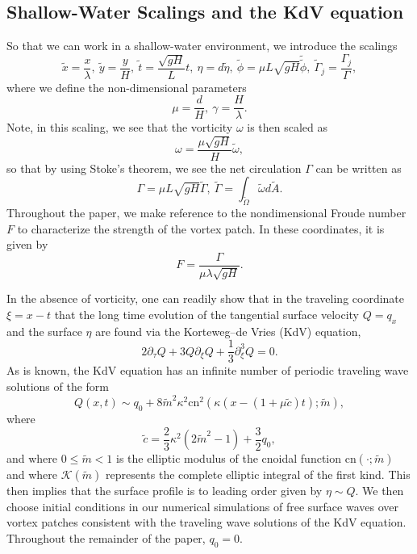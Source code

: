 \documentclass[a4paper,11pt]{article}
\newcommand{\p}{\partial}
\begin{document}
\subsection*{Shallow-Water Scalings and the KdV equation}
So that we can work in a shallow-water environment, we introduce the scalings 
\[
\tilde{x} = \frac{x}{\lambda}, ~\tilde{y} = \frac{y}{H}, ~ \tilde{t} = \frac{\sqrt{gH}}{L} t, ~ \eta = d\tilde{\eta}, ~ \tilde{\phi} = \mu L\sqrt{gH} \tilde{\tilde{\phi}}, ~ \tilde{\Gamma}_{j} = \frac{\Gamma_{j}}{\Gamma},
\]
where we define the non-dimensional parameters
\[
\mu= \frac{d}{H}, ~ \gamma = \frac{H}{\lambda}.  
\]
Note, in this scaling, we see that the vorticity $\omega$ is then scaled as 
\[
\omega = \frac{\mu \sqrt{gH}}{H}\tilde{\omega},
\]
so that by using Stoke's theorem, we see the net circulation $\Gamma$ can be written as 
\[
\Gamma = \mu L \sqrt{gH} \tilde{\Gamma}, ~ \tilde{\Gamma} = \int_{ \tilde{\Omega} } \tilde{\omega} d\tilde{A}.
\]
Throughout the paper, we make reference to the nondimensional Froude number $F$ to characterize the strength of the vortex patch.  In these coordinates, it is given by 
\[
F = \frac{\Gamma}{\mu \lambda \sqrt{gH}}.
\]

In the absence of vorticity, one can readily show that in the traveling coordinate $\xi = x-t$ that the long time evolution of the tangential surface velocity $Q = q_{x}$ and the surface $\eta$ are found via the Korteweg--de Vries (KdV) equation, 
\[
2\p_{\tau}Q + 3Q\p_{\xi}Q + \frac{1}{3} \p_{\xi}^{3}Q = 0.
\]
As is known, the KdV equation has an infinite number of periodic traveling wave solutions of the form 
\begin{equation}
Q(x,t) \sim q_{0} + 8 \tilde{m}^{2}\kappa^{2}\mbox{cn}^{2}\left(\kappa \left( x- \left(1 + \mu \tilde{c}\right)t\right);\tilde{m}\right),
\label{kdvsolpot}
\end{equation}
where
\[
\tilde{c} = \frac{2}{3}\kappa^{2} (2\tilde{m}^{2}-1)+\frac{3}{2}q_{0},
\]
and where $0\leq \tilde{m}<1$ is the elliptic modulus of the cnoidal function $\mbox{cn}(\cdot;\tilde{m})$ and where $\mathcal{K}(\tilde{m})$ represents the complete elliptic integral of the first kind.  This then implies that the surface profile is to leading order given by $\eta \sim Q$.  We then choose initial conditions in our numerical simulations of free surface waves over vortex patches consistent with the traveling wave solutions of the KdV equation.  Throughout the remainder of the paper, $q_{0}=0$.  

\end{document}
